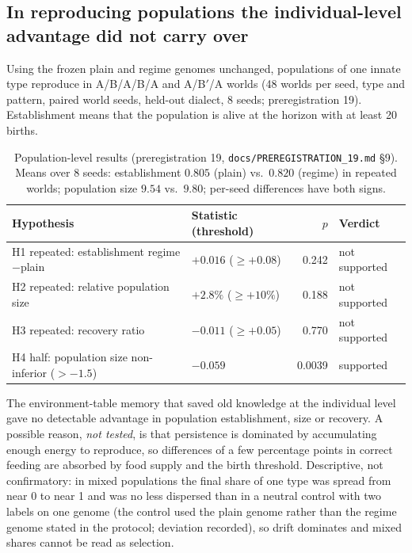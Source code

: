 \documentclass[11pt]{article}
\begin{document}
\subsection{In reproducing populations the individual-level advantage did not carry over}
Using the frozen plain and regime genomes unchanged, populations of one innate type reproduce in A/B/A/B/A and A/B$'$/A worlds (48 worlds per seed, type and pattern, paired world seeds, held-out dialect, 8 seeds; preregistration 19). Establishment means that the population is alive at the horizon with at least 20 births.
\begin{table}[h]\centering\small
\begin{tabular}{@{}p{6.4cm}p{3.4cm}rl@{}}\toprule
Hypothesis & Statistic (threshold) & $p$ & Verdict\\\midrule
H1 repeated: establishment regime$-$plain & $+0.016$ ($\ge+0.08$) & 0.242 & not supported\\
H2 repeated: relative population size & $+2.8\%$ ($\ge+10\%$) & 0.188 & not supported\\
H3 repeated: recovery ratio & $-0.011$ ($\ge+0.05$) & 0.770 & not supported\\
H4 half: population size non-inferior ($>-1.5$) & $-0.059$ & 0.0039 & supported\\\bottomrule
\end{tabular}
\caption{\label{tab:ecology}Population-level results (preregistration 19, \texttt{docs/PREREGISTRATION\_19.md} \S9). Means over 8 seeds: establishment $0.805$ (plain) vs.\ $0.820$ (regime) in repeated worlds; population size $9.54$ vs.\ $9.80$; per-seed differences have both signs.}
\end{table}
The environment-table memory that saved old knowledge at the individual level gave no detectable advantage in population establishment, size or recovery. A possible reason, \emph{not tested}, is that persistence is dominated by accumulating enough energy to reproduce, so differences of a few percentage points in correct feeding are absorbed by food supply and the birth threshold. Descriptive, not confirmatory: in mixed populations the final share of one type was spread from near 0 to near 1 and was no less dispersed than in a neutral control with two labels on one genome (the control used the plain genome rather than the regime genome stated in the protocol; deviation recorded), so drift dominates and mixed shares cannot be read as selection.
\end{document}
